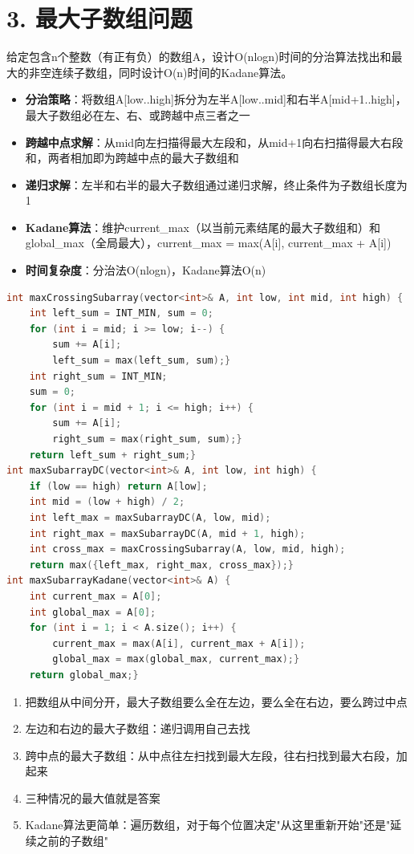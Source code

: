 \section*{3. 最大子数组问题}

给定包含n个整数（有正有负）的数组A，设计O(nlogn)时间的分治算法找出和最大的非空连续子数组，同时设计O(n)时间的Kadane算法。

\begin{itemize}
    \item \textbf{分治策略}：将数组A[low..high]拆分为左半A[low..mid]和右半A[mid+1..high]，最大子数组必在左、右、或跨越中点三者之一
    \item \textbf{跨越中点求解}：从mid向左扫描得最大左段和，从mid+1向右扫描得最大右段和，两者相加即为跨越中点的最大子数组和
    \item \textbf{递归求解}：左半和右半的最大子数组通过递归求解，终止条件为子数组长度为1
    \item \textbf{Kadane算法}：维护current\_max（以当前元素结尾的最大子数组和）和global\_max（全局最大），current\_max = max(A[i], current\_max + A[i])
    \item \textbf{时间复杂度}：分治法O(nlogn)，Kadane算法O(n)
\end{itemize}

\begin{lstlisting}[language=C++, style=cppstyle]
int maxCrossingSubarray(vector<int>& A, int low, int mid, int high) {
    int left_sum = INT_MIN, sum = 0;
    for (int i = mid; i >= low; i--) {
        sum += A[i];
        left_sum = max(left_sum, sum);}
    int right_sum = INT_MIN;
    sum = 0;
    for (int i = mid + 1; i <= high; i++) {
        sum += A[i];
        right_sum = max(right_sum, sum);}
    return left_sum + right_sum;}
int maxSubarrayDC(vector<int>& A, int low, int high) {
    if (low == high) return A[low];
    int mid = (low + high) / 2;
    int left_max = maxSubarrayDC(A, low, mid);
    int right_max = maxSubarrayDC(A, mid + 1, high);
    int cross_max = maxCrossingSubarray(A, low, mid, high);
    return max({left_max, right_max, cross_max});}
int maxSubarrayKadane(vector<int>& A) {
    int current_max = A[0];
    int global_max = A[0];
    for (int i = 1; i < A.size(); i++) {
        current_max = max(A[i], current_max + A[i]);
        global_max = max(global_max, current_max);}
    return global_max;}
\end{lstlisting}

\begin{enumerate}
    \item 把数组从中间分开，最大子数组要么全在左边，要么全在右边，要么跨过中点
    \item 左边和右边的最大子数组：递归调用自己去找
    \item 跨中点的最大子数组：从中点往左扫找到最大左段，往右扫找到最大右段，加起来
    \item 三种情况的最大值就是答案
    \item Kadane算法更简单：遍历数组，对于每个位置决定"从这里重新开始"还是"延续之前的子数组"
\end{enumerate}
